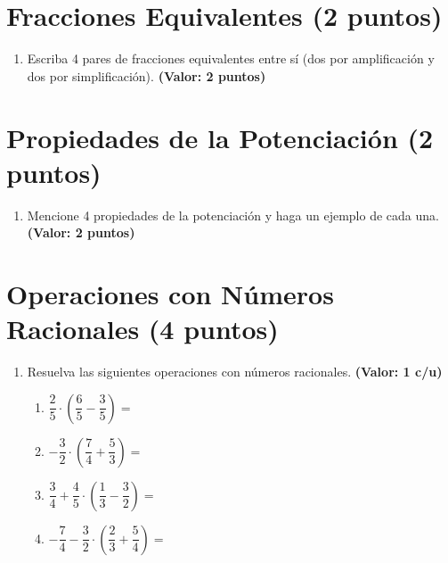 \documentclass[12pt, letterpaper]{article}
\begin{document}
\section{Fracciones Equivalentes (2 puntos)}

\begin{enumerate}[leftmargin=*, resume]

  \item Escriba 4 pares de fracciones equivalentes entre sí (dos por amplificación y dos por simplificación). \hfill \textbf{(Valor: 2 puntos)}

\end{enumerate}

\section{Propiedades de la Potenciación (2 puntos)}

\begin{enumerate}[leftmargin=*, resume]

  \item Mencione 4 propiedades de la potenciación y haga un ejemplo de cada una. \hfill \textbf{(Valor: 2 puntos)}

\end{enumerate}

\section{Operaciones con Números Racionales (4 puntos)}

\begin{enumerate}[leftmargin=*, resume]

  \item Resuelva las siguientes operaciones con números racionales. \hfill \textbf{(Valor: 1 c/u)}
        \begin{enumerate}[label=\alph*), leftmargin=*]
          \item $\dfrac{2}{5} \cdot \left(\dfrac{6}{5} - \dfrac{3}{5}\right) =$
          \item $-\dfrac{3}{2} \cdot \left(\dfrac{7}{4} + \dfrac{5}{3}\right) =$
          \item $\dfrac{3}{4} + \dfrac{4}{5} \cdot \left(\dfrac{1}{3} - \dfrac{3}{2}\right) =$
          \item $-\dfrac{7}{4} - \dfrac{3}{2} \cdot \left(\dfrac{2}{3} + \dfrac{5}{4}\right) =$
        \end{enumerate}

\end{enumerate}
\end{document}
